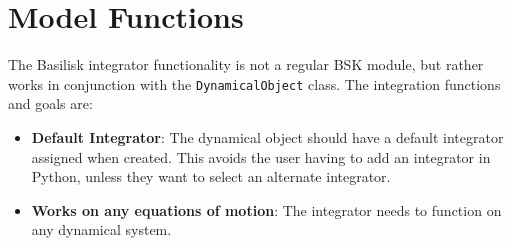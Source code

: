 
\section{Model Functions}

The Basilisk integrator functionality is not a regular BSK module, but rather works in conjunction with the {\tt DynamicalObject} class.    The integration functions and goals are:


\begin{itemize}
	\item \textbf{Default Integrator}: The dynamical object should have a default integrator assigned when created.  This avoids the user having to add an integrator in Python, unless they want to select an alternate integrator.
	\item \textbf{Works on any equations of motion}: The integrator needs to function on any dynamical system.
\end{itemize}